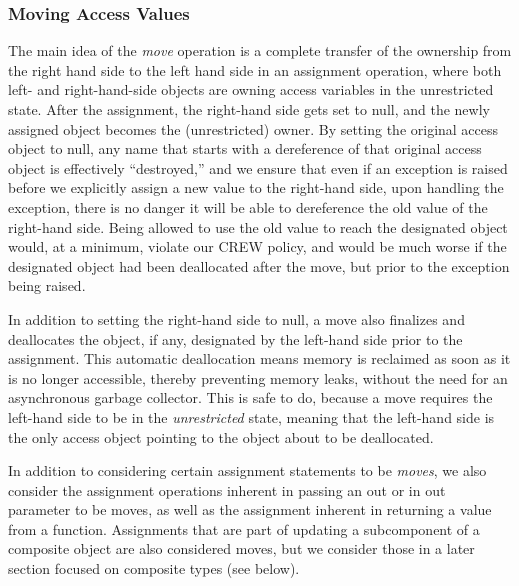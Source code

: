 \documentclass{llncs}
\newcommand{\keyword}[1]{\textsf{#1}}
\begin{document}
\subsubsection{Moving Access Values}
\label{sec:moving}

The main idea of the \textit{move} operation is a complete transfer of the ownership from the right hand side to the left hand side in an assignment operation, where both left- and right-hand-side objects are owning access variables in the unrestricted state.
After the assignment, the right-hand side gets set to null, and the newly assigned object becomes the (unrestricted) owner. By setting the original access object to null, any name that starts with a dereference of
that original access object is effectively ``destroyed,'' and we ensure that even if an exception is raised before we explicitly assign a new value to the right-hand side, upon handling the exception, there is no danger it will
be able to dereference the old value of the right-hand side.  Being allowed to use the old value to reach the designated object would, at a minimum, violate our CREW policy, and would be much worse if the designated object had been deallocated after the move, but prior to the exception being raised.


In addition to setting the right-hand side to null, a move also finalizes and deallocates the object, if any, designated by the
left-hand side prior to the assignment.  This automatic deallocation means memory is reclaimed as soon as it is
no longer accessible, thereby preventing memory leaks, without the need for an asynchronous garbage collector.
This is safe to do, because a move requires the left-hand side to be in the \textit{unrestricted} state, meaning that
the left-hand side is the only access object pointing to the object about to be deallocated.


In addition to considering certain assignment statements to be \textit{moves}, we also consider the assignment
operations inherent in passing an \keyword{out} or \keyword{in out} parameter to be moves, as well
as the assignment inherent in returning a value from a function.
Assignments that are part of updating a subcomponent of a composite object are also considered moves, but
we consider those in a later section focused on composite types (see below).
\end{document}
